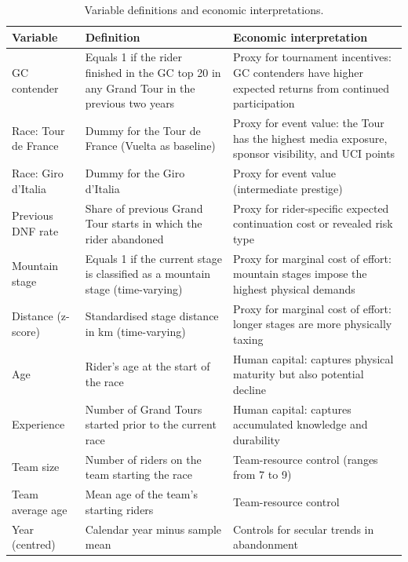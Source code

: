 \begin{table}[H]
\centering
\caption{Variable definitions and economic interpretations.}
\label{tab:variables}
\small
\begin{tabular}{@{}p{2.2cm}p{4cm}p{9cm}@{}}
\toprule
\textbf{Variable} & \textbf{Definition} & \textbf{Economic interpretation} \\
\midrule
GC contender & Equals 1 if the rider finished in the GC top 20 in any Grand Tour in the previous two years & Proxy for tournament incentives: GC contenders have higher expected returns from continued participation \\
Race: Tour de France & Dummy for the Tour de France (Vuelta as baseline) & Proxy for event value: the Tour has the highest media exposure, sponsor visibility, and UCI points \\
Race: Giro d'Italia & Dummy for the Giro d'Italia & Proxy for event value (intermediate prestige) \\
Previous DNF rate & Share of previous Grand Tour starts in which the rider abandoned & Proxy for rider-specific expected continuation cost or revealed risk type \\
Mountain stage & Equals 1 if the current stage is classified as a mountain stage (time-varying) & Proxy for marginal cost of effort: mountain stages impose the highest physical demands \\
Distance (z-score) & Standardised stage distance in km (time-varying) & Proxy for marginal cost of effort: longer stages are more physically taxing \\
Age & Rider's age at the start of the race & Human capital: captures physical maturity but also potential decline \\
Experience & Number of Grand Tours started prior to the current race & Human capital: captures accumulated knowledge and durability \\
Team size & Number of riders on the team starting the race & Team-resource control (ranges from 7 to 9) \\
Team average age & Mean age of the team's starting riders & Team-resource control \\
Year (centred) & Calendar year minus sample mean & Controls for secular trends in abandonment \\
\bottomrule
\end{tabular}
\end{table}